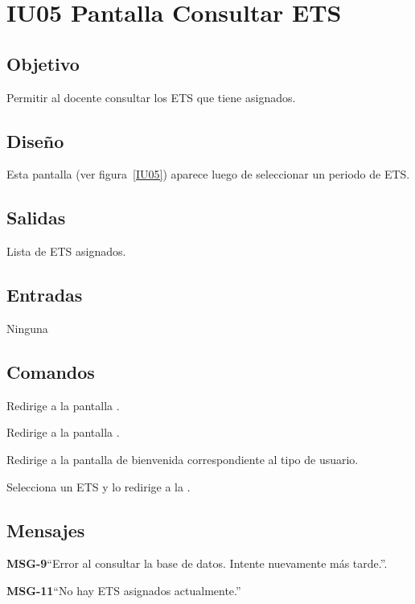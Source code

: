 \section{IU05 Pantalla Consultar ETS}

\subsection{Objetivo}
	Permitir al docente consultar los ETS que tiene asignados. 

\subsection{Diseño}
	Esta pantalla  (ver figura~\ref{IU05}) aparece luego de seleccionar un periodo de ETS. 


\subsection{Salidas}
	Lista de ETS asignados. 

\subsection{Entradas}
	Ninguna
	
\subsection{Comandos}
\begin{Citemize}

	\item {} Redirige a la pantalla .
	\item {} Redirige a la pantalla .
	\item {} Redirige a la pantalla de bienvenida correspondiente al tipo de usuario.
	\item {} Selecciona un ETS y lo redirige a la .
\end{Citemize}

\subsection{Mensajes}

\begin{Citemize}
	\item {\bf MSG-9}{``Error al consultar la base de datos. Intente nuevamente más tarde.''.}
	\item {\bf MSG-11}{``No hay ETS asignados actualmente.''}
\end{Citemize}

